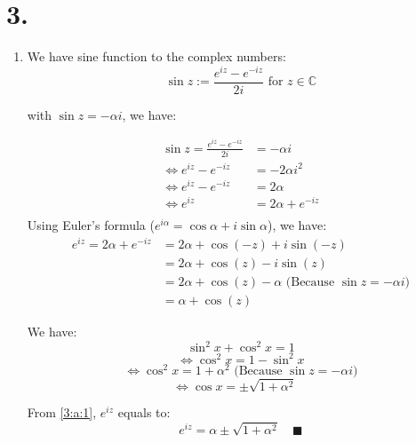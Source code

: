 \documentclass{article}
\begin{document}
        \newpage
        \section*{3. }
        \begin{enumerate}[label=({\alph*})]
            \item
            We have sine function to the complex numbers:
            \[\sin{z}:=\frac{e^{iz} - e^{-iz}}{2i} \text{ for } z \in \mathbb{C}\]

            with \(\sin{z} = -\alpha i \), we have:

            \begin{align*}
                \sin{z} = \frac{e^{iz} - e^{-iz}}{2i} &= - \alpha i\\
                        \Leftrightarrow e^{iz} - e^{-iz} &= -2\alpha i^{2}\\
                        \Leftrightarrow e^{iz} - e^{-iz} &= 2 \alpha\\
                        \Leftrightarrow e^{iz} &=  2\alpha + e^{-iz} \\ 
            \end{align*}
            Using Euler's formula (\(e^{i \alpha} = \cos{\alpha} + i\sin{\alpha}\)), we have:
            \begin{align*}
                 e^{iz} =  2\alpha + e^{-iz} &= 2\alpha + \cos{(-z)} + i\sin{(-z)}\\
                                            &= 2\alpha + \cos{(z)} - i\sin{(z)}\\
                                            &= 2\alpha + \cos{(z)} -\alpha \text{ (Because \(\sin{z} = -\alpha i )\)}\\
                                            &= \alpha + \cos{(z)}
            \end{align*}
        

        We have:
            \[\sin^{2}{x} + \cos^{2}{x} = 1\]
            \[\Leftrightarrow \cos^{2}{x} = 1 - \sin^{2}{x}\]
            \[\Leftrightarrow \cos^{2}{x} = 1 + \alpha^{2}  \text{ (Because \(\sin{z} = -\alpha i )\)}\]
            \begin{equation}
                \Leftrightarrow \cos{x} = \pm \sqrt{1 + \alpha^{2}} \quad \label{3:a:1}
            \end{equation}

            From \eqref{3:a:1}, \(e^{iz}\) equals to:
            \[e^{iz} = \alpha \pm \sqrt{1 + \alpha^{2}} \quad \blacksquare\]



\end{enumerate}
\end{document}
